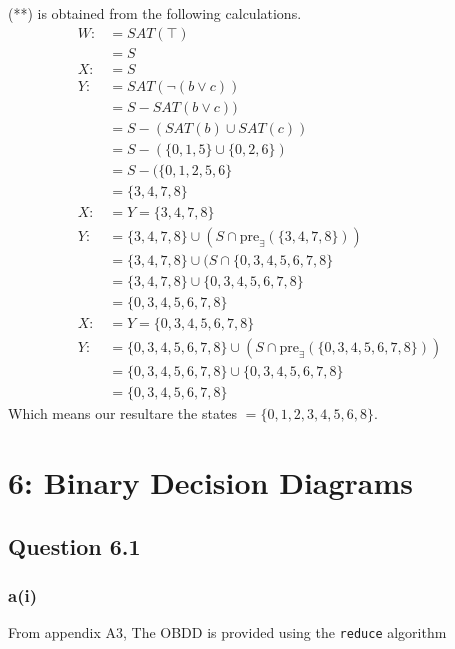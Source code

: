 \documentclass[12pt]{article}
\begin{document}
(**) is obtained from the following calculations.
\begin{align*}
W:&=SAT(\top) \\
&=S \\
X:&=S\\
Y:&=SAT(\neg(b\lor c)) \\
&=S-SAT(b\lor c)) \\
&=S-(SAT(b)\cup SAT(c)) \\
&=S-(\{0,1,5\}\cup \{0,2,6\}) \\
&=S-(\{0,1,2,5,6\} \\
&=\{3,4,7,8\} \\
X:&=Y=\{3,4,7,8\} \\
Y:&=\{3,4,7,8\}\cup (S\cap \mbox{pre}_{\exists}(\{3,4,7,8\})) \\
&=\{3,4,7,8\}\cup (S\cap \{0,3,4,5,6,7,8\} \\
&=\{3,4,7,8\}\cup \{0,3,4,5,6,7,8\} \\
&=\{0,3,4,5,6,7,8\} \\
X:&=Y=\{0,3,4,5,6,7,8\}\\
Y:&=\{0,3,4,5,6,7,8\}\cup (S\cap \mbox{pre}_{\exists}(\{0,3,4,5,6,7,8\})) \\
&=\{0,3,4,5,6,7,8\}\cup \{0,3,4,5,6,7,8\} \\
&=\{0,3,4,5,6,7,8\}
\end{align*}
Which means our resultare the states $=\{0,1,2,3,4,5,6,8\}$.

\section*{6: Binary Decision Diagrams}
\subsection*{Question 6.1}
\subsubsection*{a(i)}
From appendix A3, The OBDD is provided using the \texttt{reduce} algorithm

\newpage
\end{document}
